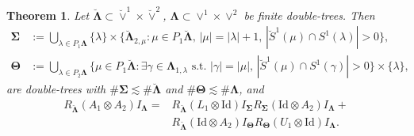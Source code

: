 \documentclass{amsart}
\newtheorem{theorem}{Theorem}[section]
\theoremstyle{definition}
\theoremstyle{remark}
\numberwithin{equation}{section}
\newcommand{\1}{\mathbb 1}
\begin{document}
\begin{theorem} \label{thm1} Let $\bm{\breve{\Lambda}} \subset \breve{\vee}^1 \times \breve{\vee}^2$, $\bm{\Lambda} \subset \vee^1 \times \vee^2$ be finite double-trees. Then
\begin{align*}
\bm{\Sigma}&:=\bigcup_{\lambda \in P_1 \bm{\Lambda}} \{\lambda\} \times \big\{
\bm{\breve{\Lambda}}_{2,\mu}
:\mu \in P_1 \bm{\breve{\Lambda}},\,|\mu|=|\lambda|+1,\,|\breve{S}^1(\mu) \cap S^1(\lambda)|>0\big\},\\
\bm{\Theta}&:=\bigcup_{\lambda \in P_{2} \bm{\Lambda}} 
\{\mu \in  P_{1} \bm{\breve{\Lambda}} : \exists \gamma \in \bm{\Lambda}_{1,\lambda} \text{ s.t. } |\gamma|= |\mu|,\,|\breve{S}^1(\mu) \cap S^1(\gamma)|>0\}
 \times \{\lambda\},
\end{align*}
are double-trees with $\# \bm{\Sigma} \lesssim \# \bm{\breve{\Lambda}}$ and $\# \bm{\Theta} \lesssim \# \bm{\Lambda}$, and
\begin{equation} \label{splitting}
\begin{split}
R_{\bm{\breve{\Lambda}}} (A_1 \otimes A_2) I_{\bm{\Lambda}}=
 & R_{\bm{\breve{\Lambda}}} (L_1 \otimes \mathrm{Id}) I_{\bm{\Sigma}}  R_{\bm{\Sigma}} (\mathrm{Id} \otimes A_2) I_{\bm{\Lambda}}+\\
& R_{\bm{\breve{\Lambda}}} (\mathrm{Id} \otimes A_2) I_{\bm{\Theta}}  R_{\bm{\Theta}} (U_1 \otimes \mathrm{Id}) I_{\bm{\Lambda}}.
\end{split}
\end{equation}
\end{theorem}
\end{document}
